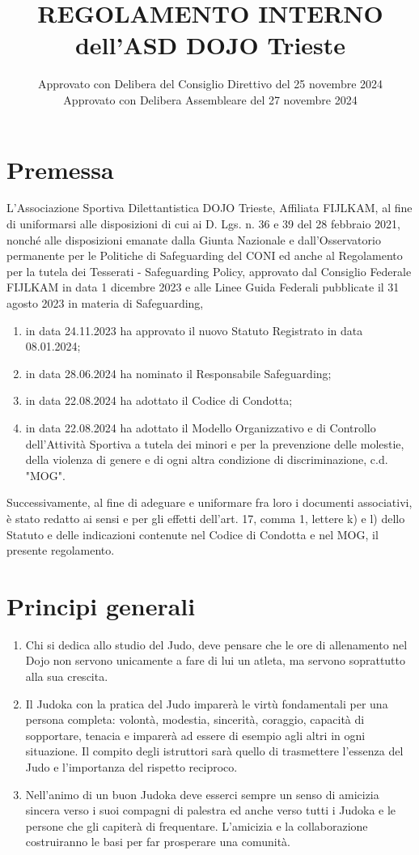 \documentclass{djtsasddoc}
\title{REGOLAMENTO INTERNO \\[2pt] dell'ASD DOJO Trieste}
\date{Approvato con Delibera del Consiglio Direttivo del 25 novembre 2024 \\ Approvato con Delibera Assembleare del 27 novembre 2024}
\begin{document}
	\maketitle
	
	\section*{Premessa}
	L'Associazione Sportiva Dilettantistica DOJO Trieste, Affiliata FIJLKAM, al fine di uniformarsi alle disposizioni di cui ai D. Lgs. n. 36 e 39 del 28 febbraio 2021, nonché alle disposizioni emanate dalla Giunta Nazionale e dall'Osservatorio permanente per le Politiche di Safeguarding del CONI ed anche al Regolamento per la tutela dei Tesserati - Safeguarding Policy, approvato dal Consiglio Federale FIJLKAM in data 1 dicembre 2023 e alle Linee Guida Federali pubblicate il 31 agosto 2023 in materia di Safeguarding,
	\begin{enumerate}[label = \alph*.]
		\item in data 24.11.2023 ha approvato il nuovo Statuto Registrato in data 08.01.2024;
		\item in data 28.06.2024 ha nominato il Responsabile Safeguarding;
		\item in data 22.08.2024 ha adottato il Codice di Condotta;
		\item in data 22.08.2024 ha adottato il Modello Organizzativo e di Controllo dell'Attività Sportiva a tutela dei minori e per la prevenzione delle molestie, della violenza di genere e di ogni altra condizione di discriminazione, c.d. "MOG".
	\end{enumerate}
	Successivamente, al fine di adeguare e uniformare fra loro i documenti associativi, è stato redatto ai sensi e per gli effetti dell'art. 17, comma 1, lettere k) e l) dello Statuto e delle indicazioni contenute nel Codice di Condotta e nel MOG, il presente regolamento.
	
	\section{Principi generali}
	\begin{enumerate}
		\item Chi si dedica allo studio del Judo, deve pensare che le ore di allenamento nel Dojo non servono unicamente a fare di lui un atleta, ma servono soprattutto alla sua crescita.
		\item Il Judoka con la pratica del Judo imparerà le virtù fondamentali per una persona completa: volontà, modestia, sincerità, coraggio, capacità di sopportare, tenacia e imparerà ad essere di esempio agli altri in ogni situazione. Il compito degli istruttori sarà quello di trasmettere l’essenza del Judo e l’importanza del rispetto reciproco.
		\item Nell'animo di un buon Judoka deve esserci sempre un senso di amicizia sincera verso i suoi compagni di palestra ed anche verso tutti i Judoka e le persone che gli capiterà di frequentare. L'amicizia e la collaborazione costruiranno le basi per far prosperare una comunità.
	\end{enumerate}
	
\end{document}
